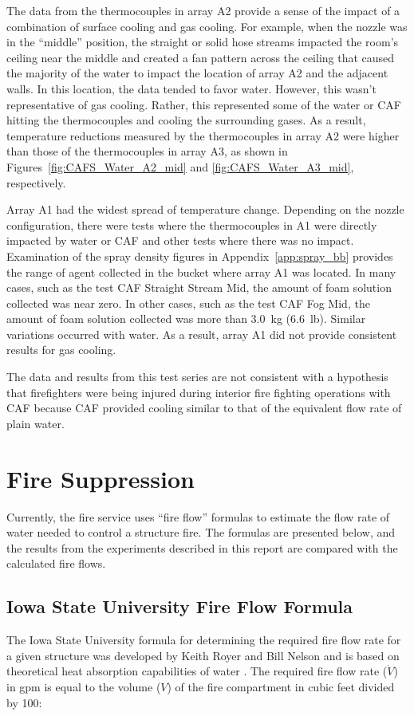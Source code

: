 \documentclass[12pt,oneside]{book}
\begin{document}
The data from the thermocouples in array A2 provide a sense of the impact of a combination of surface cooling and gas cooling. For example, when the nozzle was in the ``middle'' position, the straight or solid hose streams impacted the room's ceiling near the middle and created a fan pattern across the ceiling that caused the majority of the water to impact the location of array A2 and the adjacent walls. In this location, the data tended to favor water. However, this wasn't representative of gas cooling. Rather, this represented some of the water or CAF hitting the thermocouples and cooling the surrounding gases. As a result, temperature reductions measured by the thermocouples in array A2 were higher than those of the thermocouples in array A3, as shown in Figures~\ref{fig:CAFS_Water_A2_mid} and \ref{fig:CAFS_Water_A3_mid}, respectively.

Array A1 had the widest spread of temperature change. Depending on the nozzle configuration, there were tests where the thermocouples in A1 were directly impacted by water or CAF and other tests where there was no impact. Examination of the spray density figures in Appendix~\ref{app:spray_bb} provides the range of agent collected in the bucket where array A1 was located. In many cases, such as the test CAF Straight Stream Mid, the amount of foam solution collected was near zero. In other cases, such as the test CAF Fog Mid, the amount of foam solution collected was more than 3.0~kg (6.6~lb). Similar variations occurred with water. As a result, array A1 did not provide consistent results for gas cooling.  

The data and results from this test series are not consistent with a hypothesis that firefighters were being injured during interior fire fighting operations with CAF because CAF provided cooling similar to that of the equivalent flow rate of plain water.

\section{Fire Suppression}
\label{sec:Fire_Suppression_discussion}

Currently, the fire service uses ``fire flow'' formulas to estimate the flow rate of water needed to control a structure fire. The formulas are presented below, and the results from the experiments described in this report are compared with the calculated fire flows.

\subsection{Iowa State University Fire Flow Formula}
The Iowa State University formula for determining the required fire flow rate for a given structure was developed by Keith Royer and Bill Nelson and is based on theoretical heat absorption capabilities of water \cite{Royer:ISU}. The required fire flow rate ($\dot{V}$) in gpm is equal to the volume ($V$) of the fire compartment in cubic feet divided by 100:
\end{document}
